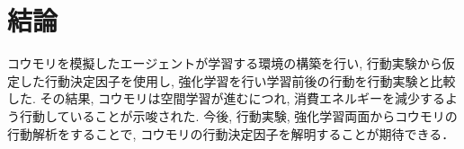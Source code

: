 \documentclass[../main]{subfiles}
\begin{document}
\newpage
\chapter{結論}
\label{chap:summary}
コウモリを模擬したエージェントが学習する環境の構築を行い, 
行動実験から仮定した行動決定因子を使用し, 
強化学習を行い学習前後の行動を行動実験と比較した.
その結果, コウモリは空間学習が進むにつれ, 
消費エネルギーを減少するよう行動していることが示唆された.
今後, 行動実験, 強化学習両面からコウモリの行動解析をすることで, 
コウモリの行動決定因子を解明することが期待できる．
\end{document}
